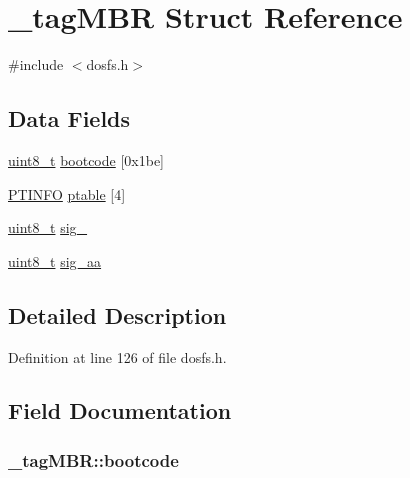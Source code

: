 \hypertarget{struct__tag_m_b_r}{\section{\-\_\-tag\-M\-B\-R Struct Reference}
\label{struct__tag_m_b_r}
}


{\ttfamily \#include $<$dosfs.\-h$>$}

\subsection*{Data Fields}
\begin{DoxyCompactItemize}
\item 
\hyperlink{stdint_8h_aba7bc1797add20fe3efdf37ced1182c5}{uint8\-\_\-t} \hyperlink{struct__tag_m_b_r_adc073c70797e974820bd4bdfc985a4e6}{bootcode} \mbox{[}0x1be\mbox{]}
\item 
\hyperlink{_common_2_libraries_2dosfs_2dosfs_8h_a081316ec82d8e36f8d7fd67a55f7d315}{P\-T\-I\-N\-F\-O} \hyperlink{struct__tag_m_b_r_aea30f6b40de3831f6d550a3a93e620a3}{ptable} \mbox{[}4\mbox{]}
\item 
\hyperlink{stdint_8h_aba7bc1797add20fe3efdf37ced1182c5}{uint8\-\_\-t} \hyperlink{struct__tag_m_b_r_aee1e69049db8d559180250167e1d80f6}{sig\-\_}
\item 
\hyperlink{stdint_8h_aba7bc1797add20fe3efdf37ced1182c5}{uint8\-\_\-t} \hyperlink{struct__tag_m_b_r_a58d7eae6321ec3f9b7eca19c79cf21b4}{sig\-\_\-aa}
\end{DoxyCompactItemize}


\subsection{Detailed Description}


Definition at line 126 of file dosfs.\-h.



\subsection{Field Documentation}
\hypertarget{struct__tag_m_b_r_adc073c70797e974820bd4bdfc985a4e6}{
\subsubsection[{bootcode}]{ \-\_\-tag\-M\-B\-R\-::bootcode}}\label{struct__tag_m_b_r_adc073c70797e974820bd4bdfc985a4e6}


